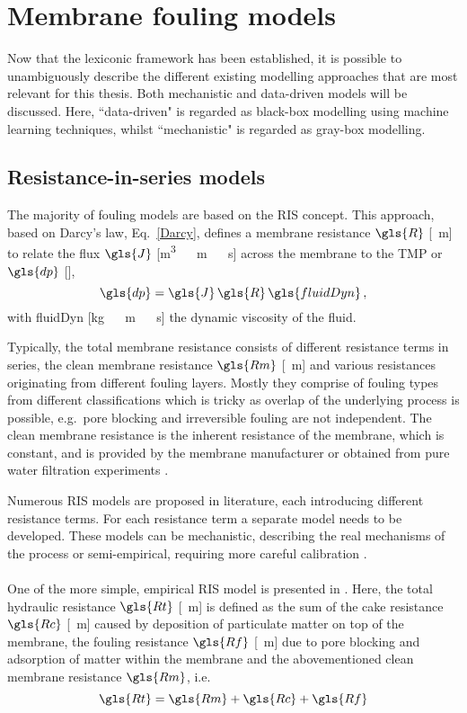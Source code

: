 \section{Membrane fouling models}
Now that the lexiconic framework has been established, it is possible to unambiguously describe the different existing modelling approaches that are most relevant for this thesis. Both mechanistic and data-driven models will be discussed. Here, ``data-driven" is regarded as black-box modelling using machine learning techniques, whilst ``mechanistic" is regarded as gray-box modelling.

\subsection{Resistance-in-series models \label{sec:RIS}}

The majority of fouling models are based on the \gls{RIS} concept. This approach, based on Darcy's law, Eq.\ \eqref{Darcy}, defines a membrane resistance $\gls{R}$ [\unit{\reciprocal\metre}] to relate the flux $\gls{J}$ [\unit{\cubic\metre \, \rpsquare\metre \, \reciprocal\second}] across the membrane to the \gls{TMP} or $\gls{dp}$ [\pascal],
\begin{equation}
\gls{dp} = \gls{J}\, \gls{R}\, \gls{fluidDyn}  \, ,
\label{Darcy}
\end{equation}
with \gls{fluidDyn} [\unit{\kilogram \, \reciprocal\metre \, \reciprocal\second}] the dynamic viscosity of the fluid. \par
Typically, the total membrane resistance consists of different resistance terms in series, the clean membrane resistance $\gls{Rm}$ [\unit{\reciprocal\metre}] and various resistances originating from different fouling layers. Mostly they comprise of fouling types from different classifications which is tricky as overlap of the underlying process is possible, e.g.\ pore blocking and irreversible fouling are not independent. The clean membrane resistance is the inherent resistance of the membrane, which is constant, and is provided by the membrane manufacturer or obtained from pure water filtration experiments \citep{Naessens2012}.

Numerous \gls{RIS} models are proposed in literature, each  introducing different resistance terms. For each resistance term a separate model needs to be developed. These models can be mechanistic, describing the real mechanisms of the process or semi-empirical, requiring  more careful calibration \citep{Naessens2012}. \\ \\One of the more simple, empirical \gls{RIS} model is presented in \cite{Khan2009}. Here, the total hydraulic resistance $\gls{Rt}$ [\unit{\reciprocal\metre}] is defined as the sum of the cake resistance $\gls{Rc}$ [\unit{\reciprocal\metre}] caused by deposition of particulate matter on top of the membrane, the fouling resistance $\gls{Rf}$ [\unit{\reciprocal\metre}] due to pore blocking and adsorption of matter within the membrane and the abovementioned clean membrane resistance $\gls{Rm}$, i.e.
\begin{equation}
\gls{Rt} = \gls{Rm} + \gls{Rc} + \gls{Rf}
\label{RISKhan}
\end{equation}

